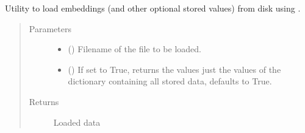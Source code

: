 \documentclass[letterpaper,10pt,english]{sphinxmanual}
\begin{document}

\begin{fulllineitems}
\label{\detokenize{code:code_utils.utils.load_embeddings}}
Utility to load embeddings (and other optional stored values) from disk
using .
\begin{quote}\begin{description}
\item[{Parameters}] \leavevmode\begin{itemize}
\item {} 
 () \textendash{} Filename of the file to be loaded.

\item {} 
 (\sphinxstyleliteralemphasis{\sphinxupquote{, }}) \textendash{} If set to True, returns the values just the values
of the dictionary containing all stored data, defaults to True.

\end{itemize}

\item[{Returns}] \leavevmode
Loaded data

\end{description}\end{quote}

\end{fulllineitems}

\end{document}
